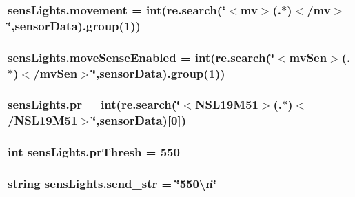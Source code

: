 \subsubsection[{\texorpdfstring{movement}{movement}}]{\setlength{\rightskip}{0pt plus 5cm}sens\+Lights.\+movement = int(re.\+search(\char`\"{}$<$mv$>$(.$\ast$)$<$/mv$>$\char`\"{},sensor\+Data).group(1))}\hypertarget{namespacesensLights_a2285eac93c571f3e13b7c75eb076d452}{}\label{namespacesensLights_a2285eac93c571f3e13b7c75eb076d452}
\subsubsection[{\texorpdfstring{move\+Sense\+Enabled}{moveSenseEnabled}}]{\setlength{\rightskip}{0pt plus 5cm}sens\+Lights.\+move\+Sense\+Enabled = int(re.\+search(\char`\"{}$<$mv\+Sen$>$(.$\ast$)$<$/mv\+Sen$>$\char`\"{},sensor\+Data).group(1))}\hypertarget{namespacesensLights_af4085cc84e3f4ffd4e949bc88e9fbd29}{}\label{namespacesensLights_af4085cc84e3f4ffd4e949bc88e9fbd29}
\subsubsection[{\texorpdfstring{pr}{pr}}]{\setlength{\rightskip}{0pt plus 5cm}sens\+Lights.\+pr = int(re.\+search(\char`\"{}$<$N\+S\+L19\+M51$>$(.$\ast$)$<$/N\+S\+L19\+M51$>$\char`\"{},sensor\+Data)\mbox{[}0\mbox{]})}\hypertarget{namespacesensLights_a3039fae16cd626cac6686b09a079e832}{}\label{namespacesensLights_a3039fae16cd626cac6686b09a079e832}
\subsubsection[{\texorpdfstring{pr\+Thresh}{prThresh}}]{\setlength{\rightskip}{0pt plus 5cm}int sens\+Lights.\+pr\+Thresh = 550}\hypertarget{namespacesensLights_abac1fd1adebeaff35fb495576dbddc5b}{}\label{namespacesensLights_abac1fd1adebeaff35fb495576dbddc5b}
\subsubsection[{\texorpdfstring{send\+\_\+str}{send_str}}]{\setlength{\rightskip}{0pt plus 5cm}string sens\+Lights.\+send\+\_\+str = \char`\"{}550\textbackslash{}n\char`\"{}}\hypertarget{namespacesensLights_a6e1162048c8d736a8db0351d57a8b139}{}\label{namespacesensLights_a6e1162048c8d736a8db0351d57a8b139}
